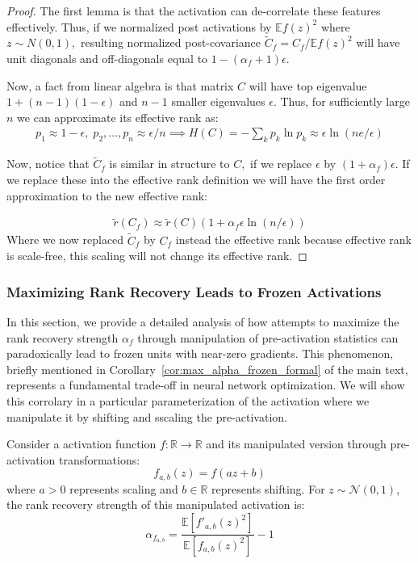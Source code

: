 \documentclass{article}
\newcommand{\E}{\mathbb{E}}
\numberwithin{figure}{section}
\begin{document}
\begin{proof}
    The first lemma is that the activation can de-correlate these features effectively. 
Thus, if we normalized post activations by $\E f(z)^2 $ where $z\sim N(0,1),$ resulting normalized post-covariance $\widetilde{C}_f = C_f / \E f(z)^2$ will have unit diagonals and off-diagonals equal to $1-(\alpha_f + 1) \epsilon.$ 

Now, a fact from linear algebra is that matrix $C$ will have top eigenvalue $1+(n-1)(1-\epsilon)$ and $n-1$ smaller eigenvalues $\epsilon. $ Thus, for sufficiently large $n$ we can approximate its effective rank as:
\begin{align*}
    p_1 \approx 1-\epsilon,\;  
    p_2,\dots, p_n \approx \epsilon/n \implies H(C)=-\sum_k p_k\ln p_k \approx \epsilon\ln(ne/\epsilon)
\end{align*}

Now, notice that $\widetilde{C}_f$ is similar in structure to $C,$ if we replace $\epsilon$ by $(1+\alpha_f)\epsilon. $ If we replace these into the effective rank definition we will have the first order approximation to the new effective rank:

\begin{align*}
    \tilde{r}(C_f)\approx \tilde{r}(C)(1 + \alpha_f \epsilon \ln(n/\epsilon) )
\end{align*}
Where we now replaced $\widetilde{C}_f$ by $C_f$ instead the effective rank because effective rank is scale-free, this scaling will not change its effective rank.  

\end{proof}


\subsubsection{Maximizing Rank Recovery Leads to Frozen Activations}
\label{app:max_rank_frozen}

In this section, we provide a detailed analysis of how attempts to maximize the rank recovery strength $\alpha_f$ through manipulation of pre-activation statistics can paradoxically lead to frozen units with near-zero gradients. This phenomenon, briefly mentioned in Corollary~\ref{cor:max_alpha_frozen_formal} of the main text, represents a fundamental trade-off in neural network optimization. We will show this corrolary in a particular parameterization of the activation where we manipulate it by shifting and sscaling the pre-activation. 

Consider a  activation function $f: \mathbb{R} \to \mathbb{R}$ and its manipulated version through pre-activation transformations:
$$f_{a,b}(z) = f(az + b)$$
where $a > 0$ represents scaling and $b \in \mathbb{R}$ represents shifting. For $z \sim \mathcal{N}(0,1)$, the rank recovery strength of this manipulated activation is:
$$\alpha_{f_{a,b}} = \frac{\mathbb{E}[f'_{a,b}(z)^2]}{\mathbb{E}[f_{a,b}(z)^2]} - 1$$
\end{document}
